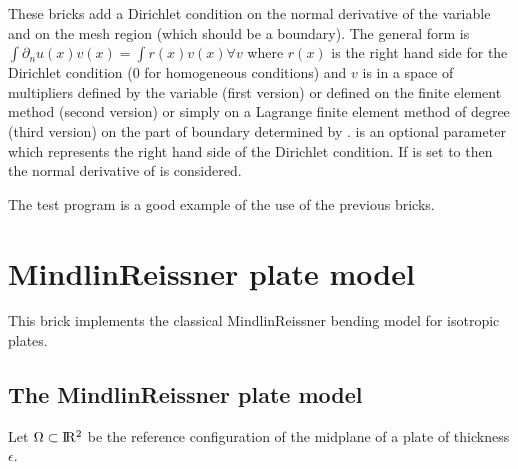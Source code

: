 \documentclass[a4paper,11pt,english]{sphinxmanual}
\begin{document}
These bricks add a Dirichlet condition on the normal derivative of the variable
 and on the mesh region  (which should be a boundary).
The general form is \(\int \partial_n u(x)v(x) = \int r(x)v(x) \forall v\)
where \(r(x)\) is the right hand side for the Dirichlet condition (0 for
homogeneous conditions) and \(v\) is in a space of multipliers
defined by the variable  (first version) or defined on the finite element method  (second version) or simply on a Lagrange finite element method of degree  (third version) on the part of boundary determined
by .  is an optional parameter which represents
the right hand side of the Dirichlet condition.
If  is set to  then the normal
derivative of  is considered.

The test program  is a good example of the use of the previous bricks.

\ignorespaces 

\section{Mindlin\sphinxhyphen{}Reissner plate model}
\label{\detokenize{userdoc/model_Mindlin_plate:mindlin-reissner-plate-model}}\label{\detokenize{userdoc/model_Mindlin_plate:ud-model-mindlin-plate}}\label{\detokenize{userdoc/model_Mindlin_plate:index-0}}\label{\detokenize{userdoc/model_Mindlin_plate::doc}}
This brick implements the classical Mindlin\sphinxhyphen{}Reissner bending model for isotropic plates.


\subsection{The Mindlin\sphinxhyphen{}Reissner plate model}
\label{\detokenize{userdoc/model_Mindlin_plate:the-mindlin-reissner-plate-model}}
Let \(\Omega \subset \rm I\hspace{-0.15em}R^2\) be the reference configuration of the mid\sphinxhyphen{}plane of a plate of thickness \(\epsilon\).
\end{document}
